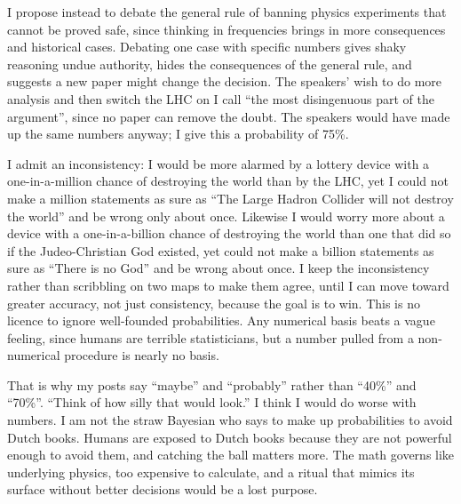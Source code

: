 I propose instead to debate the general rule of banning physics experiments that cannot be proved safe, since thinking in frequencies brings in more consequences and historical cases. Debating one case with specific numbers gives shaky reasoning undue authority, hides the consequences of the general rule, and suggests a new paper might change the decision.  The speakers' wish to do more analysis and then switch the LHC on I call ``the most disingenuous part of the argument'', since no paper can remove the doubt.  The speakers would have made up the same numbers anyway; I give this a probability of 75\%.

I admit an inconsistency: I would be more alarmed by a lottery device with a one-in-a-million chance of destroying the world than by the LHC, yet I could not make a million statements as sure as ``The Large Hadron Collider will not destroy the world'' and be wrong only about once.  Likewise I would worry more about a device with a one-in-a-billion chance of destroying the world than one that did so if the Judeo-Christian God existed, yet could not make a billion statements as sure as ``There is no God'' and be wrong about once. I keep the inconsistency rather than scribbling on two maps to make them agree, until I can move toward greater accuracy, not just consistency, because the goal is to win. This is no licence to ignore well-founded probabilities. Any numerical basis beats a vague feeling, since humans are terrible statisticians, but a number pulled from a non-numerical procedure is nearly no basis.

That is why my posts say ``maybe'' and ``probably'' rather than ``40\%'' and ``70\%''. ``Think of how silly that would look.'' I think I would do worse with numbers. I am not the straw Bayesian who says to make up probabilities to avoid Dutch books. Humans are exposed to Dutch books because they are not powerful enough to avoid them, and catching the ball matters more. The math governs like underlying physics, too expensive to calculate, and a ritual that mimics its surface without better decisions would be a lost purpose. 
